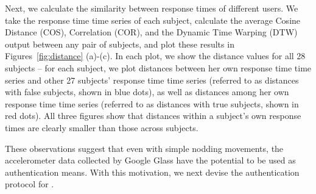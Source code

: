 Next, we calculate the similarity between response times of different users. We take the response time time series of each subject, calculate the average Cosine Distance (COS), Correlation (COR), and the Dynamic Time Warping (DTW)~\cite{cite dtw} output between any pair of subjects, and plot these results in Figures~\ref{fig:distance} (a)-(c). In each plot, we show the distance values for all 28 subjects -- for each subject, we plot distances between her own response time time series and other 27 subjects' response time time series (referred to as distances with false subjects, shown in blue dots), as well as distances among her own response time time series (referred to as distances with true subjects, shown in red dots). All three figures show that distances within a subject's own response times are clearly smaller than those across subjects.

These observations suggest that even with simple nodding movements, the accelerometer data collected by Google Glass have the potential to be used as authentication means. With this motivation, we next devise the authentication protocol for \systemname.     
